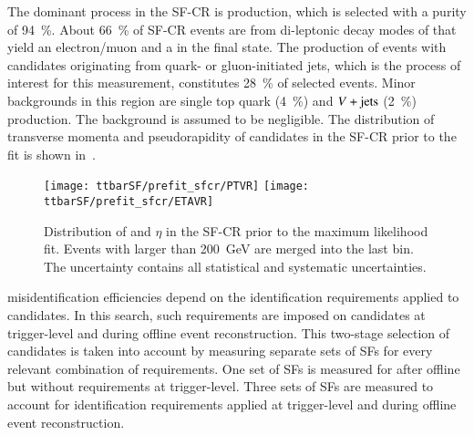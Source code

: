 The dominant process in the SF-CR is \ttbar production, which is selected with a
purity of \SI{94}{\percent}. About \SI{66}{\percent} of SF-CR events are from
di-leptonic decay modes of \ttbar that yield an electron/muon and a \tauhadvis
in the final state. The production of \ttbar events with \tauhadvis candidates
originating from quark- or gluon-initiated jets, which is the process of
interest for this measurement, constitutes \SI{28}{\percent} of selected
events. Minor backgrounds in this region are single top quark (\SI{4}{\percent})
and $V+\text{jets}$ (\SI{2}{\percent}) production. The \multijet background is assumed
to be negligible. The distribution of transverse momenta and pseudorapidity of
\tauhadvis candidates in the SF-CR prior to the fit is shown
in~.

\begin{figure}[htbp]
  \centering

  \texttt{[image: ttbarSF/prefit\_sfcr/PTVR]}%
  \texttt{[image: ttbarSF/prefit\_sfcr/ETAVR]}

  \caption{Distribution of \tauhadvis \pT and $\eta$ in the SF-CR prior to the
    maximum likelihood fit. Events with \tauhadvis \pT larger than
    \SI{200}{\GeV} are merged into the last bin. The uncertainty contains all
    statistical and systematic uncertainties.
  }%
  \label{fig:ttbarSF_prefit_pt}
\end{figure}

\Jettotauhadvis misidentification efficiencies depend on the identification
requirements applied to \tauhadvis candidates. In this search, such requirements
are imposed on \tauhadvis candidates at trigger-level and during offline event
reconstruction. This two-stage selection of \tauhadvis candidates is taken into
account by measuring separate sets of SFs for every relevant combination of
\tauid requirements. One set of SFs is measured for \faketauhadvis after offline
\tauid but without requirements at trigger-level.
Three sets of SFs are measured to account for identification requirements
applied at trigger-level and during offline event reconstruction.

